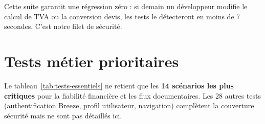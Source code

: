 \documentclass[12pt,a4paper]{report}
\begin{document}
Cette suite garantit une régression zéro : si demain un développeur modifie le calcul de TVA ou la conversion devis, les tests le détecteront en moins de 7 secondes. C'est notre filet de sécurité.

\section{Tests métier prioritaires}

Le tableau~\ref{tab:tests-essentiels} ne retient que les \textbf{14 scénarios les plus critiques} pour la fiabilité financière et les flux documentaires. Les 28 autres tests (authentification Breeze, profil utilisateur, navigation) complètent la couverture sécurité mais ne sont pas détaillés ici.

\begingroup
\footnotesize
\renewcommand{\arraystretch}{1.35}
\setlength{\tabcolsep}{8pt}
\end{document}
